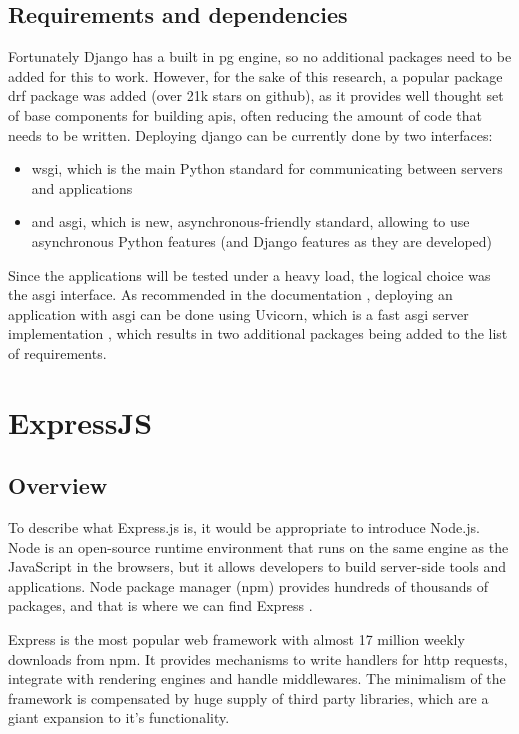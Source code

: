 \subsection{Requirements and dependencies}
Fortunately Django has a built in \acrlong{pg} engine, so no additional packages need to be added for this to work. However, for the sake of this research, a popular package \acrlong{drf} package was added (over 21k stars on github), as it provides well thought set of base components for building \acrshort{api}s, often reducing the amount of code that needs to be written.
Deploying django can be currently done by two interfaces:
\begin{itemize}
  \item \acrshort{wsgi}, which is the main Python standard for communicating between servers and applications
  \item and \acrshort{asgi}, which is new, asynchronous-friendly standard, allowing to use asynchronous Python features (and Django features as they are developed) \cite{deployingDjango}
\end{itemize}

Since the applications will be tested under a heavy load, the logical choice was the \acrshort{asgi} interface. As recommended in the documentation \cite{deployingDjango}, deploying an application with \acrshort{asgi} can be done using Uvicorn, which is a fast \acrshort{asgi} server implementation \cite{uvicorn}, which results in two additional packages being added to the list of requirements.

\section{ExpressJS}

\subsection{Overview}

To describe what Express.js is, it would be appropriate to introduce Node.js. Node is an open-source runtime environment that runs on the same engine as the JavaScript in the browsers, but it allows developers to build server-side tools and applications. Node package manager (\acrshort{npm}) provides hundreds of thousands of packages, and that is where we can find Express \cite{expressIntroduction}.

Express is the most popular web framework with almost 17 million weekly downloads from \acrshort{npm}. It provides mechanisms to write handlers for \acrshort{http} requests, integrate with rendering engines and handle middlewares. The minimalism of the framework is compensated by huge supply of third party libraries, which are a giant expansion to it's functionality.

